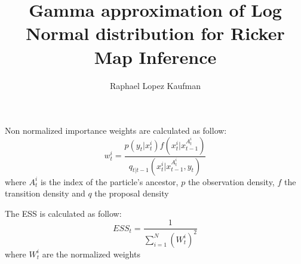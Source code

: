 \documentclass{article}
\title{Gamma approximation of Log Normal distribution for Ricker Map Inference}
\author{Raphael Lopez Kaufman}
\date{}
\begin{document}
Non normalized importance weights are calculated as follow:
\begin{equation*}
	w_t^i = \frac{p(y_t|x_t^i)f(x_t^i|x_{t-1}^{A_{t}^i})}{q_{t|t-1}(x_t^i|x_{t-1}^{A_{t}^i}, y_t)}
\end{equation*}
where $A_{t}^i$ is the index of the particle's ancestor, $p$ the observation density, $f$ the transition density and $q$ the proposal density

The ESS is calculated as follow:
\begin{equation*}
	ESS_t = \frac{1}{\sum_{i=1}^{N}{(W_t^i)^2}}
\end{equation*}
where $W_t^i$ are the normalized weights
\end{document}
